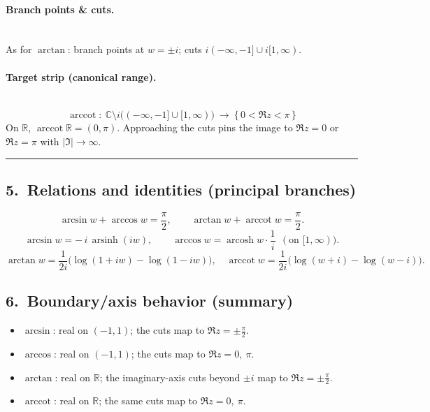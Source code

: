 \documentclass[11pt]{article}
\newcommand{\BoxEq}[1]{\begin{equation*}\boxed{\displaystyle #1}\end{equation*}}
\DeclareMathOperator{\arccot}{arccot}
\begin{document}
\paragraph{Branch points \& cuts.}\mbox{}\\[2pt]
As for $\arctan$: branch points at $w=\pm i$; cuts $i(-\infty,-1]\cup i[1,\infty)$.

\paragraph{Target strip (canonical range).}\mbox{}\\[2pt]
\BoxEq{ \arccot:\ \mathbb C\setminus i\big((-\infty,-1]\cup[1,\infty)\big)\ \longrightarrow\ \{\,0<\Re z<\pi\,\} }
On $\mathbb R$, $\arccot \mathbb R=(0,\pi)$.
Approaching the cuts pins the image to $\Re z=0$ or $\Re z=\pi$ with $|\Im|\to\infty$.

\bigskip\hrule\bigskip

\subsection*{5.\ Relations and identities (principal branches)}
\[
\arcsin w + \arccos w = \frac{\pi}{2},\qquad
\arctan w + \arccot w = \frac{\pi}{2}.
\]
\[
\arcsin w = -\,i\,\operatorname{arsinh}(i w),\qquad
\arccos w = \operatorname{arcosh} w \cdot \frac{1}{i}\ \ (\text{on }[1,\infty)).
\]
\[
\arctan w = \frac{1}{2i}\big(\log(1+i w)-\log(1-i w)\big),\quad
\arccot w = \frac{1}{2i}\big(\log(w+i)-\log(w-i)\big).
\]

\medskip

\subsection*{6.\ Boundary/axis behavior (summary)}
\begin{itemize}
	\item $\arcsin$: real on $(-1,1)$; the cuts map to $\Re z=\pm\tfrac{\pi}{2}$.
	\item $\arccos$: real on $(-1,1)$; the cuts map to $\Re z=0,\ \pi$.
	\item $\arctan$: real on $\mathbb R$; the imaginary-axis cuts beyond $\pm i$ map to $\Re z=\pm\tfrac{\pi}{2}$.
	\item $\arccot$: real on $\mathbb R$; the same cuts map to $\Re z=0,\ \pi$.
\end{itemize}
\end{document}
